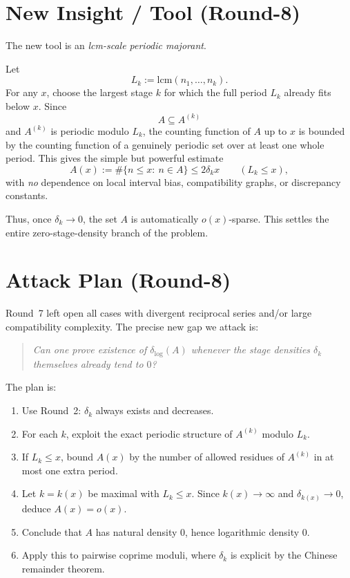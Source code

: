 \section{New Insight / Tool (Round-8)}
The new tool is an \emph{lcm-scale periodic majorant}.

Let
\begin{equation}
L_k:=\mathrm{lcm}(n_1,\dots,n_k).
\tag{8.1}
\end{equation}
For any $x$, choose the largest stage $k$ for which the full period $L_k$ already fits below $x$.
Since
\[
A\subseteq A^{(k)}
\]
and $A^{(k)}$ is periodic modulo $L_k$, the counting function of $A$ up to $x$ is bounded by the counting function of a genuinely periodic set over at least one whole period.
This gives the simple but powerful estimate
\[
A(x):=\#\{n\le x:\ n\in A\}
\le 2\delta_k x
\qquad (L_k\le x),
\]
with \emph{no} dependence on local interval bias, compatibility graphs, or discrepancy constants.

Thus, once $\delta_k\to 0$, the set $A$ is automatically $o(x)$-sparse.  This settles the entire zero-stage-density branch of the problem.

\section{Attack Plan (Round-8)}
Round~7 left open all cases with divergent reciprocal series and/or large compatibility complexity.  The precise new gap we attack is:
\begin{quote}
\emph{Can one prove existence of $\delta_{\log}(A)$ whenever the stage densities $\delta_k$ themselves already tend to $0$?}
\end{quote}

The plan is:
\begin{enumerate}
\item Use Round~2: $\delta_k$ always exists and decreases.
\item For each $k$, exploit the exact periodic structure of $A^{(k)}$ modulo $L_k$.
\item If $L_k\le x$, bound $A(x)$ by the number of allowed residues of $A^{(k)}$ in at most one extra period.
\item Let $k=k(x)$ be maximal with $L_k\le x$.  Since $k(x)\to\infty$ and $\delta_{k(x)}\to 0$, deduce $A(x)=o(x)$.
\item Conclude that $A$ has natural density $0$, hence logarithmic density $0$.
\item Apply this to pairwise coprime moduli, where $\delta_k$ is explicit by the Chinese remainder theorem.
\end{enumerate}

